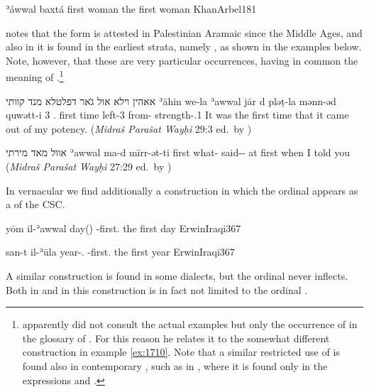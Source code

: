 {ʾáwwal baxtá}
{first woman}
{the first woman}
{KhanArbel}{181}

\citet[92, fn.\ 102]{FassbergChalla} notes that the form  is attested in {Palestinian Aramaic} since the Middle Ages, and also in  it is found in the earliest strata, namely \NrT, as shown in the examples below. Note, however, that these are very particular occurrences, having in common the  meaning of .\footnote{\citet[92, fn.\ 102]{FassbergChalla} apparently did not consult the actual examples but only the occurrence of  in the glossary of \citet[248]{SabarMidrashim}. For this reason he relates it to the somewhat different construction in example \ref{ex:1710}. Note that a similar restricted use of  is found also in contemporary , such as in \Alq, where it is found only in the expressions  and  \citep[284]{CoghillAlqosh}.}

\largerpage
{}
{אאהין וילא אול ג̇אר דפלטלא מנד קוותי}
{ʾāhin we-la ʾawwal jār d\cb{} pləṭ-la mənn-əd  quwətt-i}
{3\fem{} \cop.\fem{} first time \lnk\cb{} left-3\fem{} from-\cst{} strength-\poss.1\sg}
{It was the first time that it came out of my potency.}
{(\textit{Midraš Parašat Wayḥi} 29:3 ed.\ by \cite[85, line 27]{SabarMidrashim})}\antipar 

{אוול מאד מירתי}
{ʾawwal ma-d mīrr-ət-ti}
{first what-\cst{} said-\masc-\sg}
{at first when I told you}
{(\textit{Midraš Parašat Wayḥi} 27:29 ed.\ by \cite[51, line 2]{SabarMidrashim})}\antipar
\newpage


In vernacular \Iraq we find additionally a construction in which the ordinal appears as a \secn of the  CSC. 

{yōm il-ʾawwal}
{day(\masc) -first.\masc}
{the first day}
{ErwinIraqi}{367}

{san-t il-ʾūla}
{year-\fem.\cst{} -first.\fem}
{the first year}
{ErwinIraqi}{367}

A similar construction is found in some  dialects, but the ordinal  never inflects.  Both in \Iraq and in  this construction is in fact not limited to the ordinal .

